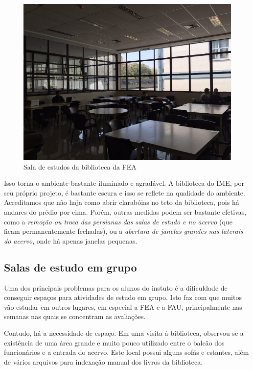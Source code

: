 \documentclass[titlepage]{article}
\begin{document}
\begin{figure}[ht!]
\caption{Sala de estudos da biblioteca da FEA}
\label{fig:luzfea}
\centering
\includegraphics[width=1\textwidth]{fea-iluminacao}
\end{figure}

Isso torna o ambiente bastante iluminado e agradável. A biblioteca do IME, por 
seu próprio projeto, é bastante escura e isso se reflete na qualidade do 
ambiente. Acreditamos que não haja como abrir clarabóias no teto da biblioteca,
pois há andares do prédio por cima. Porém, outras medidas podem ser bastante 
efetivas, como a \emph{remoção ou troca das persianas das salas de estudo e no
acervo} (que ficam permanentemente fechadas), ou a \emph{abertura de  janelas 
grandes nas laterais do acervo}, onde há apenas janelas pequenas.

\subsection{Salas de estudo em grupo}
Uma dos principais problemas para os alunos do instuto é a dificuldade de
conseguir espaços para atividades de estudo em grupo. Isto faz com que muitos
vão estudar em outros lugares, em especial a FEA e a FAU, principalmente nas
semanas nas quais se concentram as avaliações.

Contudo, há a necessidade de espaço. Em uma visita à biblioteca, observou-se a 
existência de uma área grande e muito pouco utilizado entre o balcão dos 
funcionários e a entrada do acervo. Este local possui alguns sofás e estantes,
além de vários arquivos para indexação manual dos livros da biblioteca.  
\end{document}
